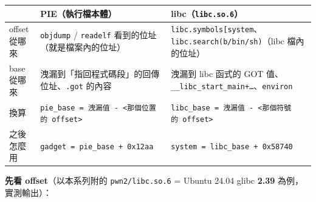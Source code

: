 \documentclass[10pt,a4paper]{article}
\newcounter{none}
\begin{document}
{\def\LTcaptype{none} %
\begin{longtable}[]{@{}
  >{\raggedright\arraybackslash}p{}
  >{\raggedright\arraybackslash}p{}
  >{\raggedright\arraybackslash}p{}@{}}
\toprule\noalign{}
\begin{minipage}[b]{\linewidth}\raggedright
\end{minipage} & \begin{minipage}[b]{\linewidth}\raggedright
PIE（執行檔本體）
\end{minipage} & \begin{minipage}[b]{\linewidth}\raggedright
libc（\texttt{libc.\allowbreak{}so.\allowbreak{}6}）
\end{minipage} \\
\midrule\noalign{}
\endhead
\bottomrule\noalign{}
\endlastfoot
offset 從哪來 & \texttt{objdump} / \texttt{readelf}
看到的位址（就是檔案內的位址） &
\texttt{libc.\allowbreak{}symbols{[}\textquotesingle{}\allowbreak{}system\textquotesingle{}\allowbreak{}{]}}、\texttt{libc.\allowbreak{}search(b\textquotesingle{}\allowbreak{}/\allowbreak{}bin/\allowbreak{}sh\textquotesingle{}\allowbreak{})}（libc
檔內的位址） \\
base 從哪來 & 洩漏到「指回程式碼段」的回傳位址、\texttt{.\allowbreak{}got} 的內容 &
洩漏到 libc 函式的 GOT
值、\texttt{\_\allowbreak{}\_\allowbreak{}libc\_\allowbreak{}start\_\allowbreak{}main+…}、\texttt{environ} \\
換算 &
\texttt{pie\_\allowbreak{}base\ \allowbreak{}=\ \allowbreak{}洩漏值\ \allowbreak{}-\allowbreak{}\ \allowbreak{}\textless{}\allowbreak{}那個位置的\ \allowbreak{}offset\textgreater{}\allowbreak{}}
&
\texttt{libc\_\allowbreak{}base\ \allowbreak{}=\ \allowbreak{}洩漏值\ \allowbreak{}-\allowbreak{}\ \allowbreak{}\textless{}\allowbreak{}那個符號的\ \allowbreak{}offset\textgreater{}\allowbreak{}} \\
之後怎麼用 & \texttt{gadget\ \allowbreak{}=\ \allowbreak{}pie\_\allowbreak{}base\ \allowbreak{}+\ \allowbreak{}0x12aa} &
\texttt{system\ \allowbreak{}=\ \allowbreak{}libc\_\allowbreak{}base\ \allowbreak{}+\ \allowbreak{}0x58740} \\
\end{longtable}
}

\textbf{先看 offset}（以本系列附的 \texttt{pwn2/\allowbreak{}libc.\allowbreak{}so.\allowbreak{}6} = Ubuntu
24.04 glibc \textbf{2.39} 為例，實測輸出）：
\end{document}

